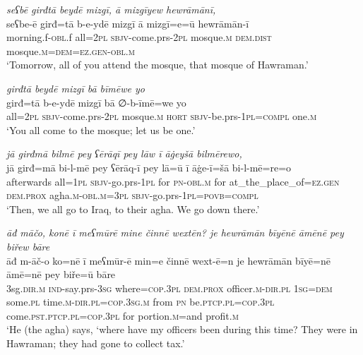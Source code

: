 \ea \label{BP.54}
\textit{seʕbē girđtā beydē mizgī, ā mizgīyew hewrāmānī,} \\ 
\gll seʕbe-ē girđ=tā b-e-ydē mizgī ā mizgī=e=ū hewrāmān-ī \\ 
 morning.f\textsc{-obl}.f all=\textsc{2pl} \textsc{sbjv-}come.prs-\textsc{2pl} mosque\textsc{.m} \textsc{dem.dist} mosque\textsc{.m}\textsc{=dem}\textsc{=ez.gen}\textsc{-obl}\textsc{.m} \\ 
\glt `Tomorrow, all of you attend the mosque, that mosque of Hawraman.'
\z 
 
\ea \label{BP.55}
\textit{girđtā beydē mizgī bā bīmēwe yo} \\ 
\gll girđ=tā b-e-ydē mizgī bā ∅-b-īmē=we yo \\ 
 all=\textsc{2pl} \textsc{sbjv-}come.prs-\textsc{2pl} mosque\textsc{.m} \textsc{hort} \textsc{sbjv-}be.prs-\textsc{1pl}\textsc{=compl} one\textsc{.m} \\ 
\glt `You all come to the mosque; let us be one.'
\z 
 
\ea \label{BP.56}
\textit{jā girđmā bilmē pey ʕērāqī pey lāw ī āġeyšā bilmērewo,} \\ 
\gll jā girđ=mā bi-l-mē pey ʕērāq-ī pey lā=ū ī āġe-ī=šā bi-l-mē=re=o \\ 
 afterwards all\textsc{=\textsc{1pl}} \textsc{sbjv-}go.prs\textsc{-\textsc{1pl}} for \textsc{pn}\textsc{-obl}\textsc{.m} for at\_the\_place\_of\textsc{=ez.gen} \textsc{dem.prox} agha\textsc{.m}\textsc{-obl}\textsc{.m}\textsc{=3pl} \textsc{sbjv-}go.prs\textsc{-\textsc{1pl}}\textsc{=\textsc{povb}}\textsc{=compl} \\ 
\glt `Then, we all go to Iraq, to their agha. We go down there.'
\z 
 
\ea \label{BP.57}
\textit{āđ māčo, konē ī meʕmūrē mine činnē wextēn? je hewrāmān bīyēnē āmēnē pey biřew bāre} \\ 
\gll āđ m-āč-o ko=nē ī meʕmūr-ē min=e činnē wext-ē=n je hewrāmān bīyē=nē āmē=nē pey biře=ū bāre \\ 
 3sg\textsc{.dir}\textsc{.m} \textsc{ind-}say.prs\textsc{-3sg} where\textsc{=cop}\textsc{.3pl} \textsc{dem.prox} officer\textsc{.m}\textsc{-dir}\textsc{.pl} \textsc{1sg}\textsc{=dem} some\textsc{.pl} time\textsc{.m}\textsc{-dir}\textsc{.pl}\textsc{=cop}\textsc{.3sg}\textsc{.m} from \textsc{pn} be\textsc{.ptcp}\textsc{.pl}\textsc{=cop}\textsc{.3pl} come\textsc{.pst}\textsc{.ptcp}\textsc{.pl}\textsc{=cop}\textsc{.3pl} for portion\textsc{.m}=and profit\textsc{.m} \\ 
\glt `He (the agha) says, ‘where have my officers been during this time? They were in Hawraman; they had gone to collect tax.'
\z 
 
